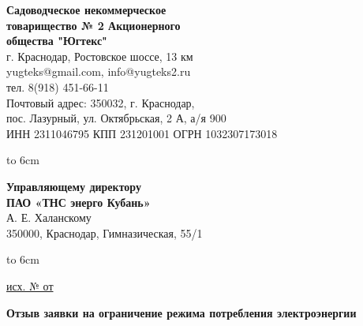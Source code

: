 
\noindent\parbox[l][71mm]{80mm}
{
	\begin{center}
		{\small \textbf{Садоводческое некоммерческое\\ товарищество
				№  2 Акционерного\\ общества "Югтекс"\\
		}}
		\footnotesize{г. Краснодар, Ростовское шоссе, 13 км\\
			yugteks@gmail.com, info@yugteks2.ru\\
			тел. 8(918) 451-66-11\\
			Почтовый адрес: 350032, г. Краснодар,\\ пос. Лазурный, ул. Октябрьская, 2 А, а/я   900
		}\\
		{ИНН 2311046795 КПП 231201001 ОГРН 1032307173018}
	\end{center}
	\hbox to 6cm{ }}\hfill
\parbox[l][71mm]{65mm}
{ \begin{center}
		\small{
			\textbf{Управляющему директору\\ ПАО «ТНС энерго Кубань»}\\
			\vspace{3mm}
			А. Е. Халанскому\\
			\vspace{3mm}
			{\footnotesize 350000, Краснодар, Гимназическая, 55/1}
			
		}
	\end{center}
	\hbox to 6cm{ }}
\linebreak
\vspace{-12mm}

\underline{исх. №  от } 

\vspace{5mm}
\begin{center}
	\Large\textbf{Отзыв заявки на ограничение режима потребления электроэнергии}
\end{center}
\par
\vspace{5mm}







